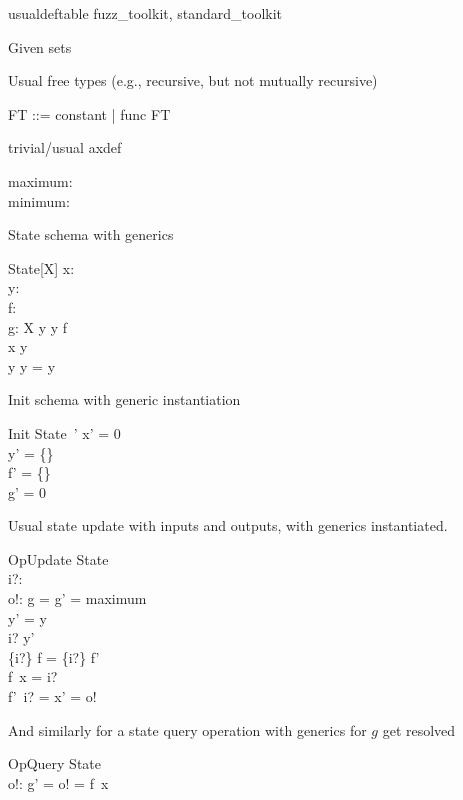 \documentclass{article}
\begin{document}
\begin{zsection}
\SECTION usualdeftable \parents fuzz\_toolkit, standard\_toolkit
\end{zsection}

Given sets
\begin{zed}
   [G]
\end{zed}

Usual free types (e.g., recursive, but not mutually recursive)
\begin{zed}
   FT ::= constant | func \ldata \nat \cross FT \rdata
\end{zed}

trivial/usual axdef
\begin{axdef}
   maximum: \nat \\
   minimum: \nat
\end{axdef}

State schema with generics
\begin{schema}{State}[X]
   x: \nat \\
   y: \power~\nat \\
   f: \nat \pfun \nat \\
   g: X
\where
   y \cross y \subseteq f \\
   x \in y \\ 
   y \cap y = y
\end{schema}

Init schema with generic instantiation
\begin{schema}{Init}
   State~'
\where
   x' = 0 \\
   y' = \{\} \\
   f' = \{\} \\
   g' = 0
\end{schema}

Usual state update with inputs and outputs, with generics instantiated.
\begin{schema}{OpUpdate}
   \Delta State \\
   i?: \nat \\
   o!: \nat
\where
   g = g' = maximum \\ %
   y' = y \\
   i? \in y' \\
   \{i?\} \dres f = \{i?\} \dres f' \\ %
   f~x = i? \\
   f'~i? = x' = o!
\end{schema}

And similarly for a state query operation with generics for $g$ get resolved
\begin{schema}{OpQuery}
  \Xi State \\
  o!: \nat
\where
   g' = o! = f~x
\end{schema}
\end{document}

